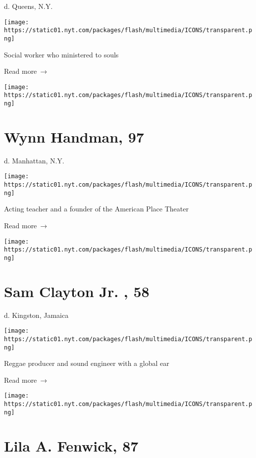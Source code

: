 d. Queens, N.Y.

\texttt{[image: https://static01.nyt.com/packages/flash/multimedia/ICONS/transparent.png]}

Social worker who ministered to souls

 Read more~→

\href{https://www.nytimes.com/2020/04/14/theater/wynn-handman-dead-coronavirus.html}{}

\texttt{[image: https://static01.nyt.com/packages/flash/multimedia/ICONS/transparent.png]}

\hypertarget{wynn-handman-97}{%
\section{Wynn Handman, 97}\label{wynn-handman-97}}

d. Manhattan, N.Y.

\texttt{[image: https://static01.nyt.com/packages/flash/multimedia/ICONS/transparent.png]}

Acting teacher and a founder of the American Place Theater

 Read more~→

\href{https://www.nytimes.com/2020/04/13/obituaries/sam-clayton-jr-dead.html}{}

\texttt{[image: https://static01.nyt.com/packages/flash/multimedia/ICONS/transparent.png]}

\hypertarget{sam-clayton-jr--58}{%
\section{Sam Clayton Jr. , 58}\label{sam-clayton-jr--58}}

d. Kingston, Jamaica

\texttt{[image: https://static01.nyt.com/packages/flash/multimedia/ICONS/transparent.png]}

Reggae producer and sound engineer with a global ear

 Read more~→

\href{https://www.nytimes.com/2020/04/13/obituaries/lila-fenwick-dead-coronavirus.html}{}

\texttt{[image: https://static01.nyt.com/packages/flash/multimedia/ICONS/transparent.png]}

\hypertarget{lila-a-fenwick-87}{%
\section{Lila A. Fenwick, 87}\label{lila-a-fenwick-87}}

